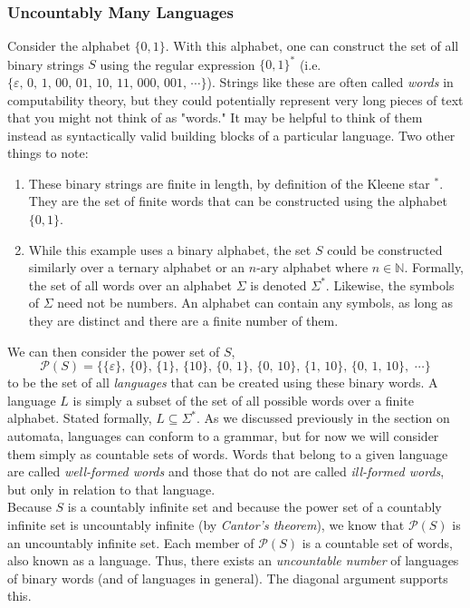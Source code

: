 \subsubsection{Uncountably Many Languages}

Consider the alphabet $\{0,1\}$. With this alphabet, one can construct the set of all binary strings $S$ using the regular expression $\{0,1\}^*$ (i.e. $\{\varepsilon,\,0,\,1,\,00,\,01,\,10,\,11,\,000,\,001,\,\cdots\}$). Strings like these are often called \textit{words} in computability theory, but they could potentially represent very long pieces of text that you might not think of as "words." It may be helpful to think of them instead as syntactically valid building blocks of a particular language. Two other things to note:
\begin{enumerate}
	\item These binary strings are finite in length, by definition of the Kleene star $^*$. They are the set of finite words that can be constructed using the alphabet $\{0,1\}$.
	\item While this example uses a binary alphabet, the set $S$ could be constructed similarly over a ternary alphabet or an $n$-ary alphabet where $n\in \mathbb{N}$. Formally, the set of all words over an alphabet $\Sigma$ is denoted $\Sigma^*$. Likewise, the symbols of $\Sigma$ need not be numbers. An alphabet can contain any symbols, as long as they are distinct and there are a finite number of them. \\
\end{enumerate}

We can then consider the power set of $S$,
$$\mathcal{P}(S)=\{\{\varepsilon\},\,\{0\},\,\{1\},\,\{10\},\,\{0,\,1\},\,\{0,\,10\},\,\{1,\,10\},\,\{0,\,1,\,10\},\,\,\cdots\}$$
to be the set of all \textit{languages} that can be created using these binary words. A language $L$ is simply a subset of the set of all possible words over a finite alphabet. Stated formally, $L\subseteq\Sigma^*$. As we discussed previously in the section on automata, languages can conform to a grammar, but for now we will consider them simply as countable sets of words. Words that belong to a given language are called \textit{well-formed words} and those that do not are called \textit{ill-formed words}, but only in relation to that language. \\

Because $S$ is a countably infinite set and because the power set of a countably infinite set is uncountably infinite (by \textit{Cantor's theorem}), we know that $\mathcal{P}(S)$ is an uncountably infinite set. Each member of $\mathcal{P}(S)$ is a countable set of words, also known as a language. Thus, there exists an \textit{uncountable number} of languages of binary words (and of languages in general). The diagonal argument supports this. \\

